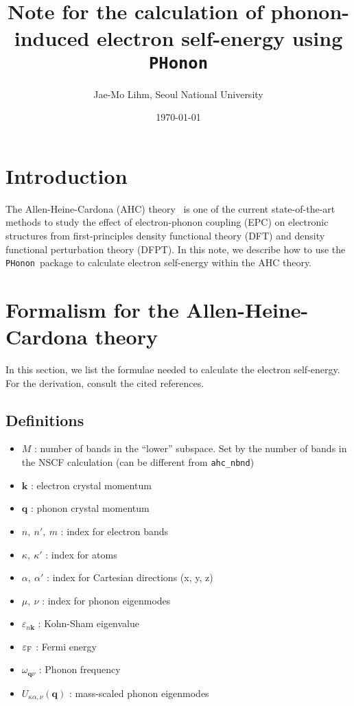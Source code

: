 \documentclass[12pt,a4paper]{article}
\def\PHonon{\texttt{PHonon}}
\newcommand{\mb}[1]{\mathbf{#1}}
\newcommand{\nk}[0]{{n\mathbf{k}}}
\newcommand{\qnu}[0]{{\mathbf{q}\nu}}
\newcommand{\veps}[0]{\varepsilon}
\begin{document}
%
\title{Note for the calculation of phonon-induced electron self-energy using
\PHonon}
\author{Jae-Mo Lihm, Seoul National University}
\date{\today}
\maketitle

\section{Introduction}
The Allen-Heine-Cardona (AHC) theory~\cite{1976Allen,1981Allen,1983Allen} is
one of the current state-of-the-art methods to study the effect
of electron-phonon coupling (EPC) on electronic structures
from first-principles density functional theory (DFT) and
density functional perturbation theory (DFPT).
In this note, we describe how to use the \PHonon\ package to calculate
electron self-energy within the AHC theory.

\section{Formalism for the Allen-Heine-Cardona theory}
In this section, we list the formulae needed to calculate the electron
self-energy. For the derivation, consult the cited references.

\subsection{Definitions} \label{sec:def}

\begin{itemize}
\item $M$ : number of bands in the ``lower'' subspace. Set by the number of
bands in the NSCF calculation (can be different from \texttt{ahc\_nbnd})
\item $\mb{k}$ : electron crystal momentum
\item $\mb{q}$ : phonon crystal momentum
\item $n,\ n',\ m$ : index for electron bands
\item $\kappa,\ \kappa'$ : index for atoms
\item $\alpha,\ \alpha'$ : index for Cartesian directions (x, y, z)
\item $\mu,\ \nu$ : index for phonon eigenmodes
\item $\veps_{\nk}$ : Kohn-Sham eigenvalue
\item $\veps_{\rm F}$ : Fermi energy
\item $\omega_{\qnu}$ : Phonon frequency
\item $U_{\kappa\alpha,\nu}(\mb{q})$ : mass-scaled phonon eigenmodes
\end{itemize}
\end{document}

